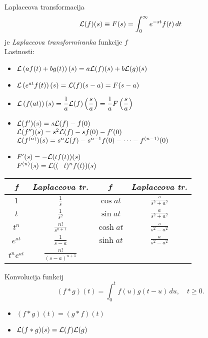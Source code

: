 \documentclass[a4paper,10pt]{article}
\begin{document}
\begin{multicols}{2}
\begin{formulaBox}{Laplaceova transformacija}
	\[
		{\cal L}(f)(s) \equiv F(s)= \int_0^\infty e^{-st}f(t)\,dt
		\]
		je \emph{ Laplaceova transformiranka} funkcije  $f$ \\	
		Lastnosti:
		\begin{itemize}
			\item  ${\cal L}\left(af(t)+bg(t)\right)(s) = a{\cal L}(f)(s) + b{\cal L}(g)(s)$ 
			\item  ${\cal L}\left(e^{at}f(t)\right)(s)={\cal L}(f)(s-a)=F(s-a)$ 
			\item $\displaystyle {\cal L}\left(f(at)\right)(s)= \frac{1}{a}{\cal L}(f)\left(\frac{s}{a}\right)=\frac{1}{a}F\left(\frac{s}{a}\right)$
			\item ${\cal L}(f')(s) = s {\cal L}(f)-f(0)$\\[0.5em]
			${\cal L}(f'')(s) = s^2 {\cal L}(f)-s f(0) - f'(0)$\\[0.5em]
			${\cal L}(f^{(n)})(s) = s^n {\cal L}(f)- s^{n-1}f(0) %
			- \cdots - f^{(n-1)}(0)$
			\item $F'(s)= -{\cal L}(tf(t))(s)$\\[0.5em]
			$F^{(n)}(s) = {\cal L}((-t)^n f(t))(s)$
		\end{itemize} 
		\begin{tabular}{|c|c||c|c|} \hline
					\emph{f} &  \emph{Laplaceova tr.}  & \emph{f} & \emph{Laplaceova tr.}  \\ \hline\hline
					{\rule[-2mm]{0mm}{7mm}$1$ }    &  $\frac{1}{s}$ & $\cos at$ & {\rule[-3mm]{0mm}{9mm} $\frac{s}{s^2+a^2}$}     \\ \hline
					$t$   &  $\frac{1}{s^2}$  &  $\sin at$  &{\rule[-3mm]{0mm}{9mm}  $\frac{a}{s^2+a^2}$ }  \\ \hline
					$t^n$   & $\frac{n!}{s^{n+1}}$    &  $\cosh at$  & {\rule[-3mm]{0mm}{9mm} $\frac{s}{s^2-a^2}$ } \\ \hline
					$e^{at}$   & $\frac{1}{s-a} $   & $\sinh at$  & {\rule[-3mm]{0mm}{9mm} $\frac{a}{s^2-a^2}$ } \\ \hline
					$t^n e^{at}$ & $\frac{n!}{(s-a)^{n+1}}$  &   &  {\rule[-3mm]{0mm}{9mm}  } \\ \hline
		\end{tabular}
\end{formulaBox}

\begin{formulaBox}{Konvolucija funkcij}
	\[  (f * g)(t) = \int_0^t f(u) g(t-u)\,du, \quad t\ge 0.
	\]
	\begin{itemize}
		\item  $(f*g)(t) = (g*f)(t)$
		\item  ${\cal L}(f*g)(s) = {\cal L}(f) {\cal L}(g)$
	\end{itemize}
\end{formulaBox}


\end{multicols}
\end{document}
